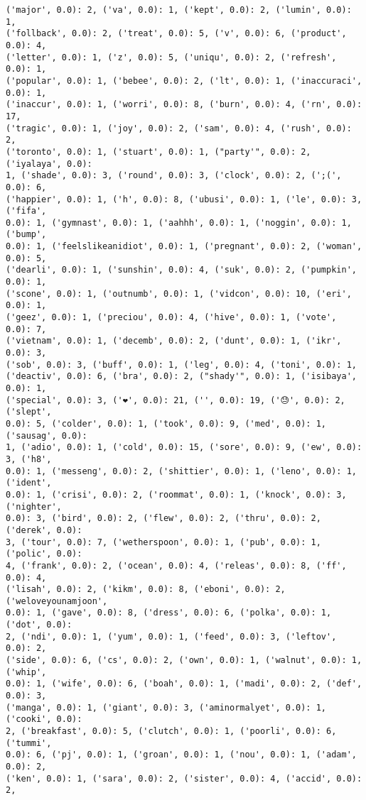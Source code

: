 \documentclass[11pt]{article}
\begin{document}
\begin{Verbatim}[commandchars=\\\{\}]
('major', 0.0): 2, ('va', 0.0): 1, ('kept', 0.0): 2, ('lumin', 0.0): 1,
('follback', 0.0): 2, ('treat', 0.0): 5, ('v', 0.0): 6, ('product', 0.0): 4,
('letter', 0.0): 1, ('z', 0.0): 5, ('uniqu', 0.0): 2, ('refresh', 0.0): 1,
('popular', 0.0): 1, ('bebee', 0.0): 2, ('lt', 0.0): 1, ('inaccuraci', 0.0): 1,
('inaccur', 0.0): 1, ('worri', 0.0): 8, ('burn', 0.0): 4, ('rn', 0.0): 17,
('tragic', 0.0): 1, ('joy', 0.0): 2, ('sam', 0.0): 4, ('rush', 0.0): 2,
('toronto', 0.0): 1, ('stuart', 0.0): 1, ("party'", 0.0): 2, ('iyalaya', 0.0):
1, ('shade', 0.0): 3, ('round', 0.0): 3, ('clock', 0.0): 2, (';(', 0.0): 6,
('happier', 0.0): 1, ('h', 0.0): 8, ('ubusi', 0.0): 1, ('le', 0.0): 3, ('fifa',
0.0): 1, ('gymnast', 0.0): 1, ('aahhh', 0.0): 1, ('noggin', 0.0): 1, ('bump',
0.0): 1, ('feelslikeanidiot', 0.0): 1, ('pregnant', 0.0): 2, ('woman', 0.0): 5,
('dearli', 0.0): 1, ('sunshin', 0.0): 4, ('suk', 0.0): 2, ('pumpkin', 0.0): 1,
('scone', 0.0): 1, ('outnumb', 0.0): 1, ('vidcon', 0.0): 10, ('eri', 0.0): 1,
('geez', 0.0): 1, ('preciou', 0.0): 4, ('hive', 0.0): 1, ('vote', 0.0): 7,
('vietnam', 0.0): 1, ('decemb', 0.0): 2, ('dunt', 0.0): 1, ('ikr', 0.0): 3,
('sob', 0.0): 3, ('buff', 0.0): 1, ('leg', 0.0): 4, ('toni', 0.0): 1,
('deactiv', 0.0): 6, ('bra', 0.0): 2, ("shady'", 0.0): 1, ('isibaya', 0.0): 1,
('special', 0.0): 3, ('❤', 0.0): 21, ('️', 0.0): 19, ('😓', 0.0): 2, ('slept',
0.0): 5, ('colder', 0.0): 1, ('took', 0.0): 9, ('med', 0.0): 1, ('sausag', 0.0):
1, ('adio', 0.0): 1, ('cold', 0.0): 15, ('sore', 0.0): 9, ('ew', 0.0): 3, ('h8',
0.0): 1, ('messeng', 0.0): 2, ('shittier', 0.0): 1, ('leno', 0.0): 1, ('ident',
0.0): 1, ('crisi', 0.0): 2, ('roommat', 0.0): 1, ('knock', 0.0): 3, ('nighter',
0.0): 3, ('bird', 0.0): 2, ('flew', 0.0): 2, ('thru', 0.0): 2, ('derek', 0.0):
3, ('tour', 0.0): 7, ('wetherspoon', 0.0): 1, ('pub', 0.0): 1, ('polic', 0.0):
4, ('frank', 0.0): 2, ('ocean', 0.0): 4, ('releas', 0.0): 8, ('ff', 0.0): 4,
('lisah', 0.0): 2, ('kikm', 0.0): 8, ('eboni', 0.0): 2, ('weloveyounamjoon',
0.0): 1, ('gave', 0.0): 8, ('dress', 0.0): 6, ('polka', 0.0): 1, ('dot', 0.0):
2, ('ndi', 0.0): 1, ('yum', 0.0): 1, ('feed', 0.0): 3, ('leftov', 0.0): 2,
('side', 0.0): 6, ('cs', 0.0): 2, ('own', 0.0): 1, ('walnut', 0.0): 1, ('whip',
0.0): 1, ('wife', 0.0): 6, ('boah', 0.0): 1, ('madi', 0.0): 2, ('def', 0.0): 3,
('manga', 0.0): 1, ('giant', 0.0): 3, ('aminormalyet', 0.0): 1, ('cooki', 0.0):
2, ('breakfast', 0.0): 5, ('clutch', 0.0): 1, ('poorli', 0.0): 6, ('tummi',
0.0): 6, ('pj', 0.0): 1, ('groan', 0.0): 1, ('nou', 0.0): 1, ('adam', 0.0): 2,
('ken', 0.0): 1, ('sara', 0.0): 2, ('sister', 0.0): 4, ('accid', 0.0): 2,

\end{Verbatim}
\end{document}
